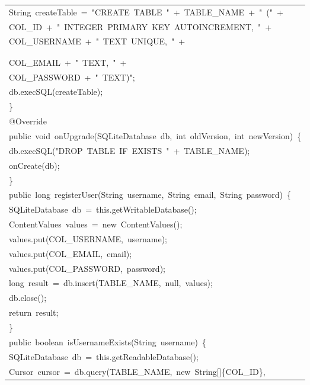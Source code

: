 \documentclass[a4paper,12pt]{article}
\begin{document}
\begin{longtable}{|p{}|}
{\ttfamily\small String\ createTable\ =\ "CREATE\ TABLE\ "\ +\ TABLE\_NAME\ +\ "\ ("\ +} \\
{\ttfamily\small COL\_ID\ +\ "\ INTEGER\ PRIMARY\ KEY\ AUTOINCREMENT,\ "\ +} \\
{\ttfamily\small COL\_USERNAME\ +\ "\ TEXT\ UNIQUE,\ "\ +} \\
\strut \\
\strut \\
{\ttfamily\small COL\_EMAIL\ +\ "\ TEXT,\ "\ +} \\
{\ttfamily\small COL\_PASSWORD\ +\ "\ TEXT)";} \\
{\ttfamily\small db.execSQL(createTable);} \\
{\ttfamily\small \}} \\
{\ttfamily\small @Override} \\
{\ttfamily\small public\ void\ onUpgrade(SQLiteDatabase\ db,\ int\ oldVersion,\ int\ newVersion)\ \{} \\
{\ttfamily\small db.execSQL("DROP\ TABLE\ IF\ EXISTS\ "\ +\ TABLE\_NAME);} \\
{\ttfamily\small onCreate(db);} \\
{\ttfamily\small \}} \\
{\ttfamily\small public\ long\ registerUser(String\ username,\ String\ email,\ String\ password)\ \{} \\
{\ttfamily\small SQLiteDatabase\ db\ =\ this.getWritableDatabase();} \\
{\ttfamily\small ContentValues\ values\ =\ new\ ContentValues();} \\
{\ttfamily\small values.put(COL\_USERNAME,\ username);} \\
{\ttfamily\small values.put(COL\_EMAIL,\ email);} \\
{\ttfamily\small values.put(COL\_PASSWORD,\ password);} \\
{\ttfamily\small long\ result\ =\ db.insert(TABLE\_NAME,\ null,\ values);} \\
{\ttfamily\small db.close();} \\
{\ttfamily\small return\ result;} \\
{\ttfamily\small \}} \\
{\ttfamily\small public\ boolean\ isUsernameExists(String\ username)\ \{} \\
{\ttfamily\small SQLiteDatabase\ db\ =\ this.getReadableDatabase();} \\
{\ttfamily\small Cursor\ cursor\ =\ db.query(TABLE\_NAME,\ new\ String[]\{COL\_ID\},} \\

\end{longtable}
\end{document}
